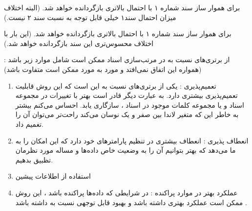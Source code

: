 \begin{boxC}
    برای هموار ساز
    سند شماره ۱ با احتمال بالاتری بازگردانده خواهد شد.
    (البته اختلاف میزان احتمال سند۱ خیلی قابل توجه به نسبت سند ۲ نیست.)

     برای هموار ساز
    سند شماره ۱ با احتمال بالاتری بازگردانده خواهد شد.
    (این بار با اختلاف محسوس‌تری این سند بازگردانده خواهد شد.)
\end{boxC}

\begin{boxE}
    از برتری‌های 
    نسبت به 
    در مرتب‌سازی اسناد ممکن است شامل موارد زیر باشد :
    (همواره این اتفاق نمی‌افتد و مورد به مورد ممکن است متفاوت باشد)
    
    \begin{enumerate}
        \item 
        تعمیم‌پذیری : یکی از برتری‌های 
        نسبت به
        این است که این روش قابلیت تعمیم‌پذیری بیشتری دارد.
        به عبارت دیگر
        قادر است بهتر با تغییرات در مجموعه اسناد و یا مجموعه کلمات موجود در اسناد ، سازگاری یابد.
        احساس می‌کنم بیشتر به خاطر این که متغیر لاندا بین صفر و یک نوسان می‌کند راحت‌تر می‌توان آن را تغمیم داد.
        
        \item 
        انعطاف‌ پذیری :
        انعطاف بیشتری در تنظیم پارامترهای خود دارد که این امکان را به ما می‌دهد که بهتر بتوانیم آن را به وضعیت خاص داده‌ها و مساله مورد نظرمان تظبیق بدهیم.

        \item 
        استفاده از اطلاعات پیشین
 

        \item 
        عملکرد بهتر در موارد پراکنده : 
        در شرایطی که داده‌ها پراکنده باشد ، این روش ممکن است عملکرد بهتری داشته باشد و بهبود قابل توجهی نسبت به 
        داشته باشد .
    \end{enumerate}
\end{boxE}